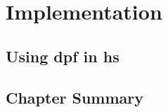 \chapter{Implementation}
\section{Using \acrshort{dpf} in \acrshort{hs}}
\section{Chapter Summary}

